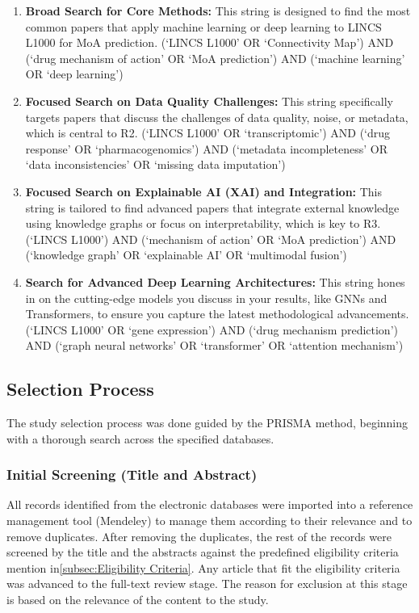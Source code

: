 \documentclass[twocolumn,12pt,a4paper]{article}
\begin{document}
\begin{enumerate}
    \item \textbf{Broad Search for Core Methods:} This string is designed to find the most common papers that apply machine learning or deep learning to LINCS L1000 for MoA prediction.
    (`LINCS L1000' OR `Connectivity Map') AND (`drug mechanism of action' OR `MoA prediction') AND (`machine learning' OR `deep learning')
    \item \textbf{Focused Search on Data Quality Challenges:} This string specifically targets papers that discuss the challenges of data quality, noise, or metadata, which is central to R2.
    (`LINCS L1000' OR `transcriptomic') AND (`drug response' OR `pharmacogenomics') AND (`metadata incompleteness' OR `data inconsistencies' OR `missing data imputation')
    \item \textbf{Focused Search on Explainable AI (XAI) and Integration:} This string is tailored to find advanced papers that integrate external knowledge using knowledge graphs or focus on interpretability, which is key to R3.
    (`LINCS L1000') AND (`mechanism of action' OR `MoA prediction') AND (`knowledge graph' OR `explainable AI' OR `multimodal fusion')
    \item \textbf{Search for Advanced Deep Learning Architectures:} This string hones in on the cutting-edge models you discuss in your results, like GNNs and Transformers, to ensure you capture the latest methodological advancements.
    (`LINCS L1000' OR `gene expression') AND (`drug mechanism prediction') AND (`graph neural networks' OR `transformer' OR `attention mechanism')
\end{enumerate}

\subsection{Selection Process}
The study selection process was done guided by the PRISMA method, beginning with a thorough search across the specified databases.
\\
\subsubsection{Initial Screening (Title and Abstract)}
All records identified from the electronic databases were imported into a reference management tool (Mendeley) to manage them according to their relevance and to remove duplicates. After removing the duplicates, the rest of the records were screened by the title and the abstracts against the predefined eligibility criteria mention in\ref{subsec:Eligibility Criteria}. Any article that fit the eligibility criteria was advanced to the full-text review stage. The reason for exclusion at this stage is based on the relevance of the content to the study.
\end{document}
